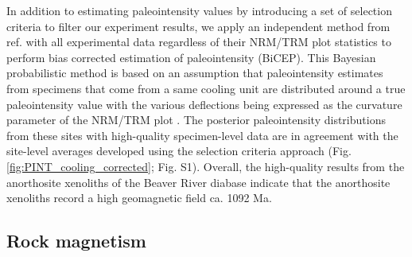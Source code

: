 \documentclass[9pt,twocolumn,twoside,lineno]{pnas-new}
\begin{document}
In addition to estimating paleointensity values by introducing a set of selection criteria to filter our experiment results, we apply an independent method from ref. \citealp{Cych2021a} with all experimental data regardless of their NRM/TRM plot statistics to perform bias corrected estimation of paleointensity (BiCEP). This Bayesian probabilistic method is based on an assumption that paleointensity estimates from specimens that come from a same cooling unit are distributed around a true paleointensity value with the various deflections being expressed as the curvature parameter of the NRM/TRM plot \cite{Paterson2011a}. The posterior paleointensity distributions from these sites with high-quality specimen-level data are in agreement with the site-level averages developed using the selection criteria approach (Fig. \ref{fig:PINT_cooling_corrected}; Fig. S1). Overall, the high-quality results from the anorthosite xenoliths of the Beaver River diabase indicate that the anorthosite xenoliths record a high geomagnetic field ca. 1092 Ma. 

\subsection*{Rock magnetism}
\end{document}
